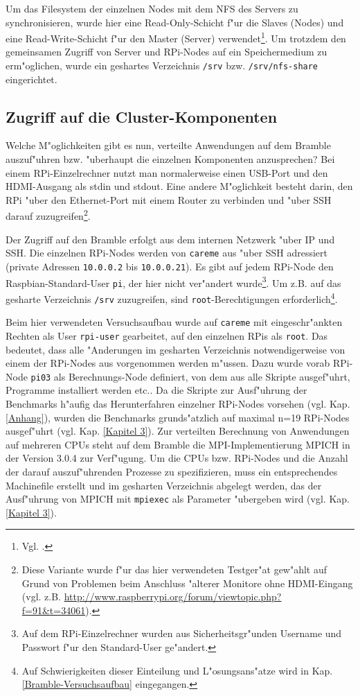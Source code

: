 Um das Filesystem der einzelnen Nodes mit dem NFS des Servers zu synchronisieren, wurde hier eine Read-Only-Schicht f"ur die Slaves (Nodes) und eine Read-Write-Schicht f"ur den Master (Server) verwendet\footnote{Vgl. \cite{kli13}.}. Um trotzdem den gemeinsamen Zugriff von Server und RPi-Nodes auf ein Speichermedium zu erm"oglichen, wurde ein geshartes Verzeichnis \texttt{/srv} bzw. \texttt{/srv/nfs-share} eingerichtet. 

\subsection{Zugriff auf die Cluster-Komponenten}\label{Zugriff}

Welche M"oglichkeiten gibt es nun, verteilte Anwendungen auf dem Bramble auszuf"uhren bzw. "uberhaupt die einzelnen Komponenten anzusprechen? Bei einem RPi-Einzelrechner nutzt man normalerweise einen USB-Port und den HDMI-Ausgang als stdin und stdout. Eine andere M"oglichkeit besteht darin, den RPi "uber den Ethernet-Port mit einem Router zu verbinden und "uber SSH darauf zuzugreifen\footnote{Diese Variante wurde f"ur das hier verwendeten Testger"at gew"ahlt auf Grund von Problemen beim Anschluss "alterer Monitore ohne HDMI-Eingang (vgl. z.B. \url{http://www.raspberrypi.org/forum/viewtopic.php?f=91&t=34061}).}. 

Der Zugriff auf den Bramble erfolgt aus dem internen Netzwerk "uber IP und SSH. Die einzelnen RPi-Nodes werden von \texttt{careme} aus "uber SSH adressiert (private Adressen \texttt{10.0.0.2} bis \texttt{10.0.0.21}). Es gibt auf jedem RPi-Node den Raspbian-Standard-User \texttt{pi}, der hier nicht ver"andert wurde\footnote{Auf dem RPi-Einzelrechner wurden aus Sicherheitsgr"unden Username und Passwort f"ur den Standard-User ge"andert.}. Um z.B. auf das gesharte Verzeichnis \texttt{/srv} zuzugreifen, sind \texttt{root}-Berechtigungen erforderlich\footnote{Auf Schwierigkeiten dieser Einteilung und L"osungsans"atze wird in Kap. \ref{Bramble-Versuchsaufbau} eingegangen.}. 

Beim hier verwendeten Versuchsaufbau wurde auf \texttt{careme} mit eingeschr"ankten Rechten als User \texttt{rpi-user} gearbeitet, auf den einzelnen RPis als \texttt{root}. Das bedeutet, dass alle "Anderungen im gesharten Verzeichnis notwendigerweise von einem der RPi-Nodes aus vorgenommen werden m"ussen. Dazu wurde vorab RPi-Node \texttt{pi03} als Berechnungs-Node definiert, von dem aus alle Skripte ausgef"uhrt, Programme installiert werden etc.. Da die Skripte zur Ausf"uhrung der Benchmarks h"aufig das Herunterfahren einzelner RPi-Nodes vorsehen (vgl. Kap. \ref{Anhang}), wurden die Benchmarks grunds"atzlich auf maximal n=19 RPi-Nodes ausgef"uhrt (vgl. Kap. \ref{Kapitel 3}). Zur verteilten Berechnung von Anwendungen auf mehreren CPUs steht auf dem Bramble die MPI-Implementierung MPICH in der Version 3.0.4 zur Verf"ugung. Um die CPUs bzw. RPi-Nodes und die Anzahl der darauf auszuf"uhrenden Prozesse zu spezifizieren, muss ein entsprechendes Machinefile erstellt und im gesharten Verzeichnis abgelegt werden, das der Ausf"uhrung von MPICH mit \texttt{mpiexec} als Parameter "ubergeben wird (vgl. Kap. \ref{Kapitel 3}). 
\endinput 